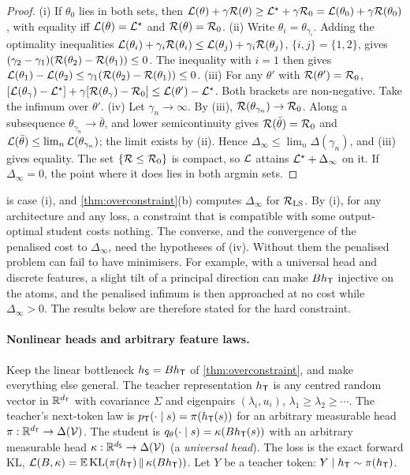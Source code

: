 \begin{proof}
(i) If $\theta_0$ lies in both sets, then $\mathcal{L}(\theta)+\gamma\mathcal{R}(\theta)\ge\mathcal{L}^\star+\gamma\mathcal{R}_0=\mathcal{L}(\theta_0)+\gamma\mathcal{R}(\theta_0)$, with
equality iff $\mathcal{L}(\theta)=\mathcal{L}^\star$ and $\mathcal{R}(\theta)=\mathcal{R}_0$.
(ii) Write $\theta_i=\theta_{\gamma_i}$. Adding the optimality inequalities
$\mathcal{L}(\theta_i)+\gamma_i\mathcal{R}(\theta_i)\le\mathcal{L}(\theta_j)+\gamma_i\mathcal{R}(\theta_j)$, $\{i,j\}=\{1,2\}$, gives
$(\gamma_2-\gamma_1)(\mathcal{R}(\theta_2)-\mathcal{R}(\theta_1))\le0$. The inequality with $i=1$ then gives
$\mathcal{L}(\theta_1)-\mathcal{L}(\theta_2)\le\gamma_1(\mathcal{R}(\theta_2)-\mathcal{R}(\theta_1))\le0$.
(iii) For any $\theta'$ with $\mathcal{R}(\theta')=\mathcal{R}_0$,
$[\mathcal{L}(\theta_\gamma)-\mathcal{L}^\star]+\gamma[\mathcal{R}(\theta_\gamma)-\mathcal{R}_0]\le\mathcal{L}(\theta')-\mathcal{L}^\star$. Both brackets are non-negative. Take the
infimum over $\theta'$.
(iv) Let $\gamma_n\to\infty$. By (iii), $\mathcal{R}(\theta_{\gamma_n})\to\mathcal{R}_0$. Along a subsequence $\theta_{\gamma_n}\to\bar\theta$, and
lower semicontinuity gives $\mathcal{R}(\bar\theta)=\mathcal{R}_0$ and $\mathcal{L}(\bar\theta)\le\lim_n\mathcal{L}(\theta_{\gamma_n})$; the limit exists by (ii).
Hence $\Delta_\infty\le\lim_n\Delta(\gamma_n)$, and (iii) gives equality. The set $\{\mathcal{R}\le\mathcal{R}_0\}$ is compact, so $\mathcal{L}$ attains
$\mathcal{L}^\star+\Delta_\infty$ on it. If $\Delta_\infty=0$, the point where it does lies in both argmin sets.
\end{proof}
\noindent
{} is case (i), and \cref{thm:overconstraint}(b) computes $\Delta_\infty$ for $\mathcal{R}_{\mathrm{LS}}$. By (i), for any
architecture and any loss, a constraint that is compatible with some output-optimal student costs nothing. The
converse, and the convergence of the penalised cost to $\Delta_\infty$, need the hypotheses of (iv). Without them the
penalised problem can fail to have minimisers. For example, with a universal head and discrete features, a slight
tilt of a principal direction can make $Bh_{\mathsf{T}}$ injective on the atoms, and the penalised infimum is then approached
at no cost while $\Delta_\infty>0$. The results below are therefore stated for the hard constraint.

\paragraph{Nonlinear heads and arbitrary feature laws.}
Keep the linear bottleneck $h_{\mathsf{S}}=Bh_{\mathsf{T}}$ of \cref{thm:overconstraint}, and make everything else general. The teacher
representation $h_{\mathsf{T}}$ is any centred random vector in $\mathbb{R}^{d_{\mathsf{T}}}$ with covariance $\Sigma$ and eigenpairs
$(\lambda_i,u_i)$, $\lambda_1\ge\lambda_2\ge\cdots$. The teacher's next-token law is $p_{\mathsf{T}}(\cdot\mid s)=\pi(h_{\mathsf{T}}(s))$ for an
arbitrary measurable head $\pi:\mathbb{R}^{d_{\mathsf{T}}}\to\Delta(\mathcal{V})$. The student is $q_\theta(\cdot\mid s)=\kappa(Bh_{\mathsf{T}}(s))$ with an arbitrary
measurable head $\kappa:\mathbb{R}^{d_{\mathsf{S}}}\to\Delta(\mathcal{V})$ (a \emph{universal head}). The loss is the exact forward KL,
$\mathcal{L}(B,\kappa)=\mathbb{E}\,\mathrm{KL}(\pi(h_{\mathsf{T}})\,\|\,\kappa(Bh_{\mathsf{T}}))$. Let $Y$ be a teacher token: $Y\mid h_{\mathsf{T}}\sim\pi(h_{\mathsf{T}})$.

